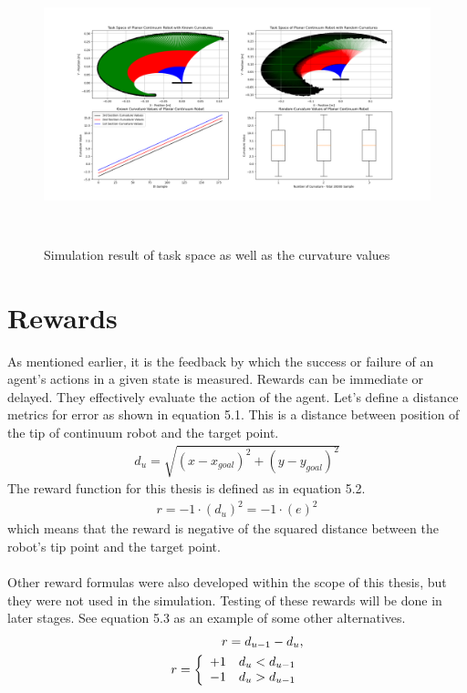 \documentclass[12pt,twoside,a4]{mwbk}
\begin{document}
\begin{figure}[h]
    \centering
    \includegraphics[width=16.0cm, height=8.0cm]{task_space_2.png}
    \caption{Simulation result of task space as well as the curvature values}
\end{figure}

\section{Rewards}
As mentioned earlier, it is the feedback by which the success or failure of an agent's actions in a given state is measured. Rewards can be immediate or delayed. They effectively evaluate the action of the agent. Let's define a distance metrics for error as shown in equation 5.1. This is a distance between position of the tip of continuum robot and the target point.
\begin{subequations}
\begin{align}
d_u = \sqrt{(x-x_{goal})^2+(y-y_{goal})^2}
\end{align}
\end{subequations}
The reward function for this thesis is defined as in equation 5.2.
\begin{subequations}
\begin{align}
r = -1\cdot (d_u)^{2} = -1\cdot(e)^{2}
\end{align}
\end{subequations}
which means that the reward is negative of the squared distance between the robot's tip point and the target point.
\\ \\
\noindent Other reward formulas were also developed within the scope of this thesis, but they were not used in the simulation. Testing of these rewards will be done in later stages. See equation 5.3 as an example of some other alternatives. 
\begin{subequations}
\begin{align}
r = d_{u-1} - d_{u}, \\ 
\medskip
r =\left\{\begin{array}{cc}
+1 & d_{u}<d_{u-1} \\
-1 & d_{u}>d_{u-1}
\end{array}\right.
\end{align}
\end{subequations}
\end{document}

